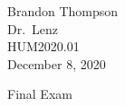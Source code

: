 \noindent
Brandon Thompson \\
Dr.\ Lenz \\
HUM2020.01 \\
December 8, 2020
\begin{center}
Final Exam
\end{center}
